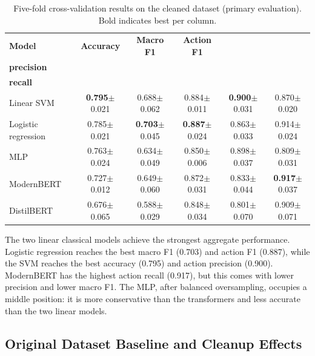 \begin{table}[H]
\centering
\caption{Five-fold cross-validation results on the cleaned dataset (primary evaluation). Bold indicates best per column.}
\label{tab:results_cleaned}
\footnotesize
\setlength{\tabcolsep}{2pt}
\begin{tabular}{@{}lccccc@{}}
\toprule
\textbf{Model} & \textbf{Accuracy} & \textbf{Macro F1} & \textbf{Action F1} & \shortstack{\textbf{Action}\\\textbf{precision}} & \shortstack{\textbf{Action}\\\textbf{recall}} \\
\midrule
Linear SVM          & \textbf{0.795}{\scriptsize$\pm$0.021} & 0.688{\scriptsize$\pm$0.062} & 0.884{\scriptsize$\pm$0.011} & \textbf{0.900}{\scriptsize$\pm$0.031} & 0.870{\scriptsize$\pm$0.020} \\
Logistic regression & 0.785{\scriptsize$\pm$0.021} & \textbf{0.703}{\scriptsize$\pm$0.045} & \textbf{0.887}{\scriptsize$\pm$0.024} & 0.863{\scriptsize$\pm$0.033} & 0.914{\scriptsize$\pm$0.024} \\
MLP                 & 0.763{\scriptsize$\pm$0.024} & 0.634{\scriptsize$\pm$0.049} & 0.850{\scriptsize$\pm$0.006} & 0.898{\scriptsize$\pm$0.037} & 0.809{\scriptsize$\pm$0.031} \\
ModernBERT          & 0.727{\scriptsize$\pm$0.012} & 0.649{\scriptsize$\pm$0.060} & 0.872{\scriptsize$\pm$0.031} & 0.833{\scriptsize$\pm$0.044} & \textbf{0.917}{\scriptsize$\pm$0.037} \\
DistilBERT          & 0.676{\scriptsize$\pm$0.065} & 0.588{\scriptsize$\pm$0.029} & 0.848{\scriptsize$\pm$0.034} & 0.801{\scriptsize$\pm$0.070} & 0.909{\scriptsize$\pm$0.071} \\
\bottomrule
\end{tabular}
\end{table}

The two linear classical models achieve the strongest aggregate performance. Logistic regression reaches the best macro F1 (0.703) and action F1 (0.887), while the SVM reaches the best accuracy (0.795) and action precision (0.900). ModernBERT has the highest action recall (0.917), but this comes with lower precision and lower macro F1. The MLP, after balanced oversampling, occupies a middle position: it is more conservative than the transformers and less accurate than the two linear models.

\subsection{Original Dataset Baseline and Cleanup Effects}
\label{sec:results_original}

